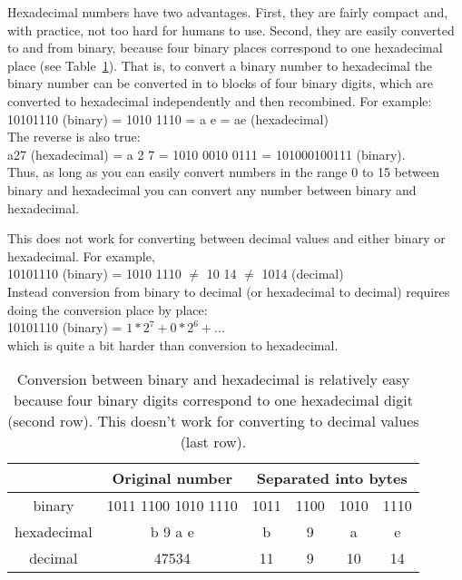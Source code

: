 Hexadecimal numbers have two advantages.  First, they are fairly compact and, with practice, not too hard for humans to use.  Second, they are easily converted to and from binary, because four binary places correspond to one hexadecimal place (see Table~\ref{tab:hexbin}).  That is, to convert a binary number to hexadecimal the binary number can be converted in to blocks of four binary digits, which are converted to hexadecimal independently and then recombined.  For example:\\
10101110 (binary) = 1010 1110 = a e = ae (hexadecimal)\\
The reverse is also true:\\
a27 (hexadecimal) = a 2 7 = 1010 0010 0111 = 101000100111 (binary).\\
Thus, as long as you can easily convert numbers in the range 0 to 15 between binary and hexadecimal you can convert any number between binary and hexadecimal.  

This does not work for converting between decimal values and either binary or hexadecimal.  For example,\\
10101110 (binary) = 1010 1110 $\neq$ 10 14  $\neq$ 1014 (decimal)\\
Instead conversion from binary to decimal (or hexadecimal to decimal) requires doing the conversion place by place:\\
10101110 (binary) = $1*2^{7} + 0*2^{6} + ...$ \\
which is quite a bit harder than conversion to hexadecimal.


\begin{table}
\centering
\begin{tabular}{c |  c || c | c | c | c }
         & Original number & \multicolumn{4}{c}{Separated into bytes}\\
\hline
binary &   1011 1100 1010 1110 &  1011 & 1100 & 1010 & 1110 \\
hexadecimal &  b 9 a e & b & 9 & a & e\\
decimal & 47534 & 11 & 9 & 10 & 14 \\
\end{tabular}
\caption{Conversion between binary and hexadecimal is relatively easy because four binary digits correspond to one hexadecimal digit (second row).  This doesn't work for converting to decimal values (last row).}\label{tab:hexbin}
\end{table}

